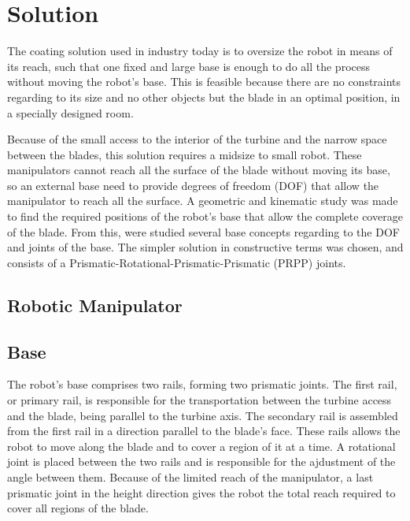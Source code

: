 \section{Solution}


The coating solution used in industry today is to oversize the robot
in means of its reach, such that one fixed and large base is enough to do all 
the process without moving the robot's base. 
This is feasible because there are no constraints regarding to its size and no
other objects but the blade in an optimal position, in a specially designed room.

Because of the small access to the interior of the turbine and the narrow space
between the blades, this solution requires a midsize to small robot. 
These manipulators cannot reach all the surface of the blade without moving its
base, so an external base need to provide degrees of freedom (DOF) that allow
the manipulator to reach all the surface.
A geometric and kinematic study was made to find the required positions of the
robot's base that allow the complete coverage of the blade.
From this, were studied several base concepts regarding to the DOF and joints of
the base. The simpler solution in constructive terms was chosen, and consists of
a Prismatic-Rotational-Prismatic-Prismatic (PRPP) joints.


\subsection{Robotic Manipulator}

\subsection{Base}

The robot's base comprises two rails, forming two prismatic joints. The first
rail, or primary rail, is responsible for the transportation between the turbine
access and the blade, being parallel to the turbine axis. The secondary
rail is assembled from the first rail in a direction parallel to the blade's face.
These rails allows the robot to move along the blade and to cover a region of it
at a time. A rotational joint is placed between the two rails and is responsible
for the ajdustment of the angle between them.
Because of the limited reach of the manipulator, a last prismatic joint in the
height direction gives the robot the total reach required to cover all regions
of the blade.

